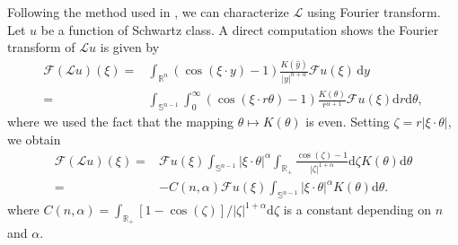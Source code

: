 \documentclass[11pt,reqno]{amsart}
\theoremstyle{definition}
\theoremstyle{remark}
\numberwithin{equation}{section}
\newcommand{\R}{{\mathbb{R}}}
\begin{document}
Following the method used in \cite[Proposition 3.3]{MR2944369}, we can characterize $\mathscr{L}$ using Fourier transform. Let $u$ be a function of Schwartz class. A direct computation shows the Fourier transform of $\mathscr{L}u$ is given by
\begin{align}
    \mathcal{F}(\mathscr{L} u)(\xi) = & \int_{\mathbb{R}^n} (\cos(\xi \cdot y)-1) \frac{K(\hat{y})}{|y|^{n+\alpha}}\mathcal{F}u(\xi) \,\mathrm{d}y \nonumber \\
    = & \int_{\mathbb{S}^{n-1}}\int_{0}^{\infty}  (\cos(\xi \cdot r\theta )  -1) \frac{K(\theta)}{r^{\alpha+1}}\mathcal{F}u(\xi) \mathrm{d}r \mathrm{d}\theta,
\end{align}
where we used the fact that the mapping $\theta \mapsto K(\theta)$ is even. Setting $\zeta = r|\xi \cdot \theta|$, we obtain
\begin{align}
    \mathcal{F}(\mathscr{L} u)(\xi)  = &  \mathcal{F}u(\xi)\int_{\mathbb{S}^{n-1}} |\xi\cdot\theta|^\alpha \int_{\R_+}   \frac{\cos(\zeta)-1}{|\zeta|^{1+\alpha}} \mathrm{d}\zeta K(\theta)\mathrm{d}\theta \nonumber \\
    = & -C(n,\alpha)\mathcal{F}u(\xi)\int_{\mathbb{S}^{n-1}}|\xi\cdot\theta|^{\alpha} K(\theta) \mathrm{d}\theta.
\end{align}
where $C(n,\alpha)= \int_{\R_+} [1-\cos(\zeta )]/|\zeta|^{1+\alpha} \mathrm{d}\zeta $ is a constant depending on $n$ and $\alpha$.
\end{document}
